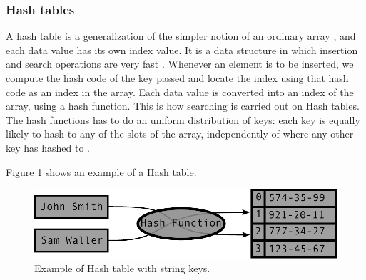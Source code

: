\documentclass{sig-alternate-05-2015}
\begin{document}
    \subsubsection{Hash tables}
        A hash table is a generalization of the simpler notion of an ordinary array
        \cite{Cormen:Algorithms}, and each data value has its own index value.
        It is a data structure in which insertion and search operations are very fast \cite{Tuto:Data}.
        Whenever an element is to be inserted, we compute the hash code of the key passed and
        locate the index using that hash code as an index in the array.
        Each data value is converted into an index of the array, using a hash function.
        This is how searching is carried out on Hash tables. The hash functions has to
        do an uniform distribution of keys: each key is equally likely to hash to any of
        the slots of the array, independently of where any other key has hashed to \cite{Cormen:Algorithms}.

        Figure \ref{img:Hash} shows an example of a Hash table.
        \begin{figure}
          \centering
          \includegraphics[scale=0.57]{Hash.pdf}
          \caption{Example of Hash table with string keys.}
          \label{img:Hash}
        \end{figure}
\end{document}
